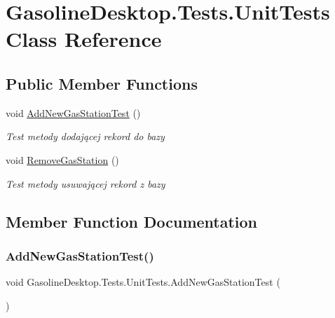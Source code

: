 \hypertarget{class_gasoline_desktop_1_1_tests_1_1_unit_tests}{}\section{Gasoline\+Desktop.\+Tests.\+Unit\+Tests Class Reference}
\label{class_gasoline_desktop_1_1_tests_1_1_unit_tests}
\subsection*{Public Member Functions}
\begin{DoxyCompactItemize}
\item 
void \mbox{\hyperlink{class_gasoline_desktop_1_1_tests_1_1_unit_tests_a64f18be90a0d89bce6dc7a10a0703a90}{Add\+New\+Gas\+Station\+Test}} ()
\begin{DoxyCompactList}\small\item\em Test metody dodającej rekord do bazy \end{DoxyCompactList}\item 
void \mbox{\hyperlink{class_gasoline_desktop_1_1_tests_1_1_unit_tests_a8efc68018ee08cddf8d64a007ca6c344}{Remove\+Gas\+Station}} ()
\begin{DoxyCompactList}\small\item\em Test metody usuwającej rekord z bazy \end{DoxyCompactList}\end{DoxyCompactItemize}


\subsection{Member Function Documentation}
\mbox{\label{class_gasoline_desktop_1_1_tests_1_1_unit_tests_a64f18be90a0d89bce6dc7a10a0703a90}} 
\subsubsection{\texorpdfstring{AddNewGasStationTest()}{AddNewGasStationTest()}}
{\footnotesize\ttfamily void Gasoline\+Desktop.\+Tests.\+Unit\+Tests.\+Add\+New\+Gas\+Station\+Test (\begin{DoxyParamCaption}{ }\end{DoxyParamCaption})}



